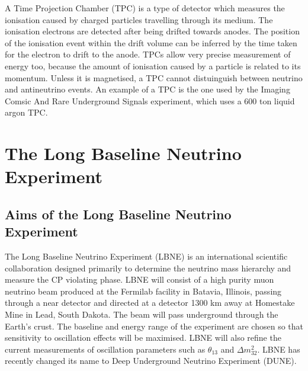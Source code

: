 \documentclass[12pt]{article}
\begin{document}
A Time Projection Chamber (TPC) is a type of detector which measures the ionisation caused by charged particles travelling through its medium. The ionisation electrons are detected after being drifted towards anodes. The position of the ionisation event within the drift volume can be inferred by the time taken for the electron to drift to the anode\cite{leo}. TPCs allow very precise measurement of energy too, because the amount of ionisation caused by a particle is related to its momentum. Unless it is magnetised, a TPC cannot distuinguish between neutrino and antineutrino events. An example of a TPC is the one used by the Imaging Comsic And Rare Underground Signals experiment, which uses a 600 ton liquid argon TPC\cite{ICARUS}. 
\section{The Long Baseline Neutrino Experiment}
\subsection{Aims of the Long Baseline Neutrino Experiment}
The Long Baseline Neutrino Experiment (LBNE) is an international scientific collaboration designed primarily to determine the neutrino mass hierarchy and measure the CP violating phase. LBNE will consist of a high purity muon neutrino beam produced at the Fermilab facility in Batavia, Illinois, passing through a near detector and directed at a detector 1300 km away at Homestake Mine in Lead, South Dakota. The beam will pass underground through the Earth's crust. The baseline and energy range of the experiment are chosen so that sensitivity to oscillation effects will be maximised. LBNE will also refine the current measurements of oscillation parameters such as $\theta_{13}$ and $\Delta m_{32}^2$\cite{LBNE}. LBNE has recently changed its name to Deep Underground Neutrino Experiment (DUNE).
\end{document}

